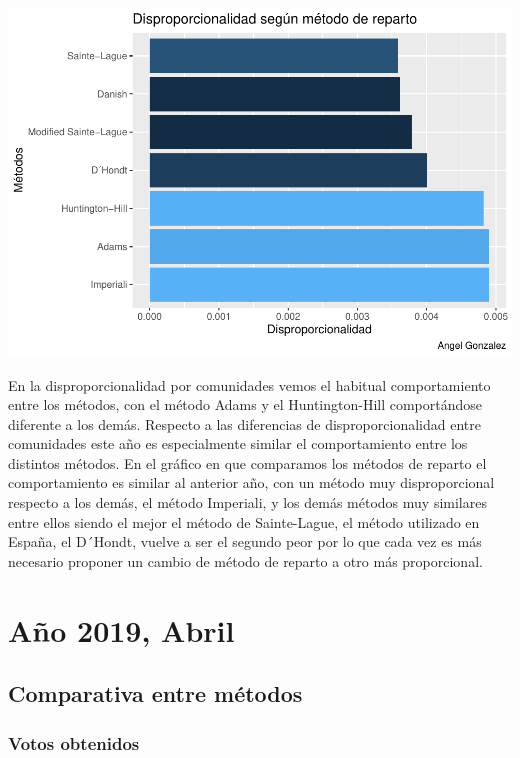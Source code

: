 \documentclass[12pt,a4paper,]{book}
\numberwithin{dummy}{section}
\theoremstyle{ocrenumbox}
\theoremstyle{blacknumex}
\theoremstyle{blacknumbox}
\theoremstyle{ocrenum}
\theoremstyle{ocrenum}
\begin{document}
\begin{center}\includegraphics[width=0.95\linewidth]{figurasR/unnamed-chunk-120-2} \end{center}

En la disproporcionalidad por comunidades vemos el habitual
comportamiento entre los métodos, con el método Adams y el
Huntington-Hill comportándose diferente a los demás. Respecto a las
diferencias de disproporcionalidad entre comunidades este año es
especialmente similar el comportamiento entre los distintos métodos. En
el gráfico en que comparamos los métodos de reparto el comportamiento es
similar al anterior año, con un método muy disproporcional respecto a
los demás, el método Imperiali, y los demás métodos muy similares entre
ellos siendo el mejor el método de Sainte-Lague, el método utilizado en
España, el D´Hondt, vuelve a ser el segundo peor por lo que cada vez es
más necesario proponer un cambio de método de reparto a otro más
proporcional.

\hypertarget{auxf1o-2019-abril}{%
\section{Año 2019, Abril}\label{auxf1o-2019-abril}}

\hypertarget{comparativa-entre-muxe9todos-13}{%
\subsection{Comparativa entre
métodos}\label{comparativa-entre-muxe9todos-13}}

\hypertarget{votos-obtenidos-13}{%
\subsubsection{Votos obtenidos}\label{votos-obtenidos-13}}
\end{document}
